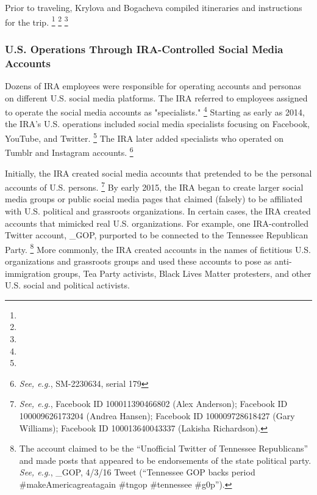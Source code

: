 Prior to traveling, Krylova and Bogacheva compiled itineraries and instructions for the trip.
\footnote{}
\footnote{}
\footnote{}

\subsubsection{U.S. Operations Through IRA-Controlled Social Media Accounts}

Dozens of IRA employees were responsible for operating accounts and personas on different U.S. social media platforms.
The IRA referred to employees assigned to operate the social media accounts as "specialists."%
\footnote{}
Starting as early as 2014, the IRA's U.S. operations included social media specialists focusing on Facebook, YouTube, and Twitter.%
\footnote{}
The IRA later added specialists who operated on Tumblr and Instagram accounts.%
\footnote{\textit{See, e.g.}, SM-2230634, serial 179}

Initially, the IRA created social media accounts that pretended to be the personal accounts of U.S. persons.%
\footnote{\textit{See, e.g.}, Facebook ID 100011390466802 (Alex Anderson);
Facebook ID 100009626173204 (Andrea Hansen);
Facebook ID 100009728618427 (Gary Williams);
Facebook ID 100013640043337 (Lakisha Richardson).}
By early 2015, the IRA began to create larger social media groups or public social media pages that claimed (falsely) to be affiliated with U.S. political and grassroots organizations.
In certain cases, the IRA created accounts that mimicked real U.S. organizations.
For example, one IRA-controlled Twitter account, \@TEN\_GOP, purported to be connected to the Tennessee Republican Party.%
\footnote{The account claimed to be the ``Unofficial Twitter of Tennessee Republicans'' and made posts that appeared to be endorsements of the state political party.
\textit{See, e.g.}, \@TEN\_GOP, 4/3/16 Tweet (``Tennessee GOP backs \@realDonaldTrump period \#makeAmericagreatagain \#tngop \#tennessee \#g0p'').}
More commonly, the IRA created accounts in the names of fictitious U.S. organizations and grassroots groups and used these accounts to pose as anti-immigration groups, Tea Party activists, Black Lives Matter protesters, and other U.S. social and political activists.

